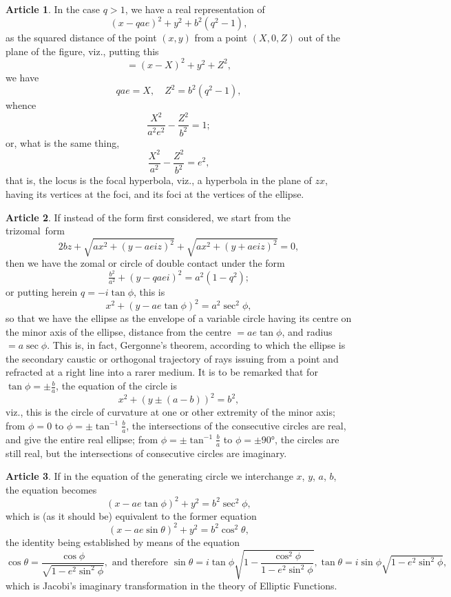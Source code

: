 \documentclass[11pt,a4paper]{article}
\theoremstyle{definition}
\newtheorem{art}{Article}
\newcommand{\trizomal}{trizomal}
\begin{document}
\begin{art}
In the case $q > 1$, we have a real representation of
\[
(x - qae)^{2} + y^{2} + b^{2}(q^{2} - 1),
\]
as the squared distance of the point $(x, y)$ from a point $(X, 0, Z)$ out of the plane of the figure, viz., putting this
\[
= (x - X)^{2} + y^{2} + Z^{2},
\]
we have
\[
qae = X, \quad Z^{2} = b^{2}(q^{2} - 1),
\]
whence
\[
\frac{X^{2}}{a^{2}e^{2}} - \frac{Z^{2}}{b^{2}} = 1;
\]
or, what is the same thing,
\[
\frac{X^{2}}{a^{2}} - \frac{Z^{2}}{b^{2}} = e^{2},
\]
that is, the locus is the focal hyperbola, viz., a hyperbola in the plane of $zx$, having its vertices at the foci, and its foci at the vertices of the ellipse.
\end{art}

\begin{art}
If instead of the form first considered, we start from the \trizomal\ form
\[
2bz + \sqrt{ax^{2} + (y - aeiz)^{2}} + \sqrt{ax^{2} + (y + aeiz)^{2}} = 0,
\]
then we have the zomal or circle of double contact under the form
\[
\tfrac{b^{2}}{a^{2}} + (y - qaei)^{2} = a^{2}(1 - q^{2});
\]
or putting herein $q = -i\tan\phi$, this is
\[
x^{2} + (y - ae\tan\phi)^{2} = a^{2}\sec^{2}\phi,
\]
so that we have the ellipse as the envelope of a variable circle having its centre on the minor axis of the ellipse, distance from the centre $= ae\tan\phi$, and radius $= a\sec\phi$. This is, in fact, Gergonne's theorem, according to which the ellipse is the secondary caustic or orthogonal trajectory of rays issuing from a point and refracted at a right line into a rarer medium. It is to be remarked that for $\tan\phi = \pm\tfrac{b}{a}$, the equation of the circle is
\[
x^{2} + (y \pm (a - b))^{2} = b^{2},
\]
viz., this is the circle of curvature at one or other extremity of the minor axis; from $\phi = 0$ to $\phi = \pm\tan^{-1}\tfrac{b}{a}$, the intersections of the consecutive circles are real, and give the entire real ellipse; from $\phi = \pm\tan^{-1}\tfrac{b}{a}$ to $\phi = \pm 90°$, the circles are still real, but the intersections of consecutive circles are imaginary.
\end{art}

\begin{art}
If in the equation of the generating circle we interchange $x$, $y$, $a$, $b$, the equation becomes
\[
(x - ae\tan\phi)^{2} + y^{2} = b^{2}\sec^{2}\phi,
\]
which is (as it should be) equivalent to the former equation
\[
(x - ae\sin\theta)^{2} + y^{2} = b^{2}\cos^{2}\theta,
\]
the identity being established by means of the equation
\[
\cos\theta = \frac{\cos\phi}{\sqrt{1 - e^{2}\sin^{2}\phi}}, \text{ and therefore } \sin\theta = i\tan\phi\sqrt{1 - \frac{\cos^{2}\phi}{1 - e^{2}\sin^{2}\phi}}, \tan\theta = i\sin\phi\sqrt{1 - e^{2}\sin^{2}\phi},
\]
which is Jacobi's imaginary transformation in the theory of Elliptic Functions.
\end{art}
\end{document}
